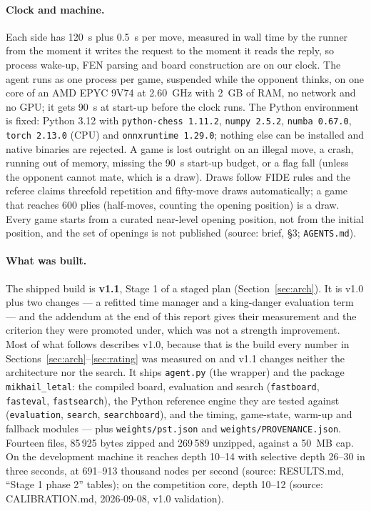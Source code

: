 \documentclass[11pt,a4paper]{article}
\newcommand{\src}[1]{{\small(source: #1)}}
\newcommand{\code}[1]{\texttt{#1}}
\begin{document}
\paragraph{Clock and machine.} Each side has 120~s plus 0.5~s per move, measured in wall time by the
runner from the moment it writes the request to the moment it reads the reply, so process wake-up, FEN
parsing and board construction are on our clock. The agent runs as one process per game, suspended while
the opponent thinks, on one core of an AMD EPYC 9V74 at 2.60~GHz with 2~GB of RAM, no network and no
GPU; it gets 90~s at start-up before the clock runs. The Python environment is fixed: Python 3.12 with
\code{python-chess 1.11.2}, \code{numpy 2.5.2}, \code{numba 0.67.0}, \code{torch 2.13.0} (CPU) and
\code{onnxruntime 1.29.0}; nothing else can be installed and native binaries are rejected. A game is lost
outright on an illegal move, a crash, running out of memory, missing the 90~s start-up budget, or a flag
fall (unless the opponent cannot mate, which is a draw). Draws follow FIDE rules and the referee claims
threefold repetition and fifty-move draws automatically; a game that reaches 600 plies (half-moves,
counting the opening position) is a draw. Every game starts from a curated near-level opening position,
not from the initial position, and the set of openings is not published \src{brief, \S 3; \code{AGENTS.md}}.

\paragraph{What was built.} The shipped build is \textbf{v1.1}, Stage 1 of a staged plan
(Section~\ref{sec:arch}). It is v1.0 plus two changes --- a refitted time manager and a king-danger
evaluation term --- and the addendum at the end of this report gives their measurement and the
criterion they were promoted under, which was not a strength improvement. Most of what follows
describes v1.0, because that is the build every number in Sections~\ref{sec:arch}--\ref{sec:rating}
was measured on and v1.1 changes neither the architecture nor the search. It ships \code{agent.py} (the wrapper) and the package \code{mikhail\_letal}:
the compiled board, evaluation and search (\code{fastboard}, \code{fasteval}, \code{fastsearch}), the
Python reference engine they are tested against (\code{evaluation}, \code{search}, \code{searchboard}),
and the timing, game-state, warm-up and fallback modules --- plus \code{weights/pst.json} and
\code{weights/PROVENANCE.json}. Fourteen files, 85\,925 bytes zipped and 269\,589 unzipped, against a
50~MB cap. On the development machine it reaches depth 10--14 with selective depth 26--30 in three
seconds, at 691--913 thousand nodes per second \src{RESULTS.md, ``Stage 1 phase 2'' tables}; on the
competition core, depth 10--12 \src{CALIBRATION.md, 2026-09-08, v1.0 validation}.
\end{document}
